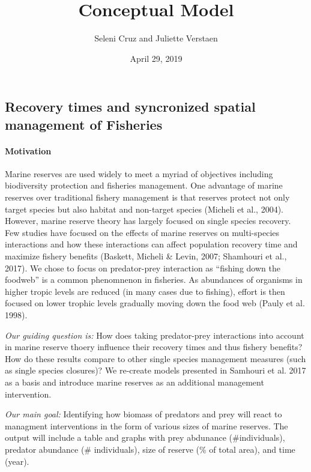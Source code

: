 \documentclass[]{article}
\title{Conceptual Model}
\author{Seleni Cruz and Juliette Verstaen}
\date{April 29, 2019}
\let\oldparagraph\paragraph
\renewcommand{\paragraph}[1]{\oldparagraph{#1}\mbox{}}
\begin{document}
\maketitle

\subsection{Recovery times and syncronized spatial management of
Fisheries}\label{recovery-times-and-syncronized-spatial-management-of-fisheries}

\paragraph{Motivation}\label{motivation}

Marine reserves are used widely to meet a myriad of objectives including
biodiversity protection and fisheries management. One advantage of
marine reserves over traditional fishery management is that reserves
protect not only target species but also habitat and non-target species
(Micheli et al., 2004). However, marine reserve theory has largely
focused on single species recovery. Few studies have focused on the
effects of marine reserves on multi-species interactions and how these
interactions can affect population recovery time and maximize fishery
benefits (Baskett, Micheli \& Levin, 2007; Shamhouri et al., 2017). We
chose to focus on predator-prey interaction as ``fishing down the
foodweb'' is a common phenomnenon in fisheries. As abundances of
organisms in higher tropic levels are reduced (in many cases due to
fishing), effort is then focused on lower trophic levels gradually
moving down the food web (Pauly et al. 1998).

\emph{Our guiding question is:} How does taking predator-prey
interactions into account in marine reserve thoery influence their
recovery times and thus fishery benefits? How do these results compare
to other single species management measures (such as single species
closures)? We re-create models presented in Samhouri et al. 2017 as a
basis and introduce marine reserves as an additional management
intervention.

\emph{Our main goal:} Identifying how biomass of predators and prey will
react to managment interventions in the form of various sizes of marine
reserves. The output will include a table and graphs with prey abdunance
(\#individuals), predator abundance (\# individuals), size of reserve
(\% of total area), and time (year).
\end{document}
